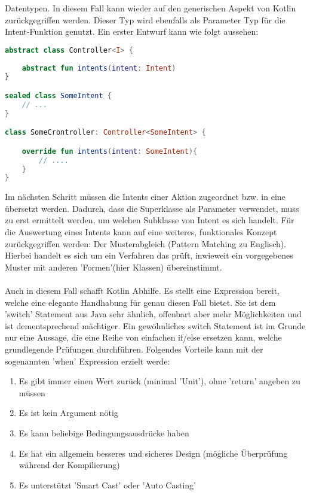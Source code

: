 Datentypen. In diesem Fall kann wieder auf den generischen Aspekt von Kotlin zurückgegriffen werden. 
Dieser Typ wird ebenfalls als Parameter Typ für die Intent-Funktion genutzt. Ein erster Entwurf kann wie 
folgt aussehen:
\\
\begin{lstlisting}[caption={Erster Controller Entwurf}, label={}, language=Kotlin]
abstract class Controller<I> {
	
	abstract fun intents(intent: Intent)
}

sealed class SomeIntent {
	// ...
}

class SomeCrontroller: Controller<SomeIntent> {

	override fun intents(intent: SomeIntent){
		// ....
	}
}
\end{lstlisting}
\bigskip
Im nächsten Schritt müssen die Intents einer Aktion zugeordnet bzw. in eine übersetzt werden. Dadurch, 
dass die Superklasse als Parameter verwendet, muss zu erst ermittelt werden, um welchen Subklasse von 
Intent es sich handelt. Für die Auswertung eines Intents kann auf eine weiteres, funktionales Konzept 
zurückgegriffen werden: Der Musterabgleich (Pattern Matching zu Englisch). Hierbei handelt es sich um ein 
Verfahren das prüft, inwieweit ein vorgegebenes Muster mit anderen 'Formen'(hier Klassen) übereinstimmt. 
\\
\\
Auch in diesem Fall schafft Kotlin Abhilfe. Es stellt eine Expression bereit, welche eine elegante 
Handhabung für genau diesen Fall bietet. Sie ist dem 'switch' Statement aus Java sehr ähnlich, offenbart 
aber mehr Möglichkeiten und ist dementsprechend mächtiger. Ein gewöhnliches switch Statement ist im 
Grunde nur eine Aussage, die eine Reihe von einfachen if/else ersetzen kann, welche grundlegende Prüfungen durchführen. Folgendes Vorteile kann mit der sogenannten 'when' Expression erzielt werde:
\begin{enumerate}
	\item Es gibt immer einen Wert zurück (minimal 'Unit'), ohne 'return' angeben zu müssen
	\item Es ist kein Argument nötig
	\item Es kann beliebige Bedingungsausdrücke haben
	\item \label{when-design} Es hat ein allgemein besseres und sicheres Design (mögliche Überprüfung während der Kompilierung)
	\item \label{when-smart-cast} Es unterstützt 'Smart Cast' oder 'Auto Casting'
\end{enumerate}
